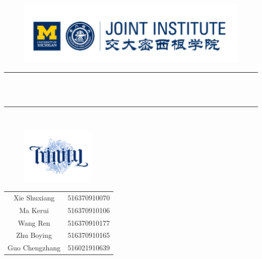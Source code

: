 \begin{titlepage}

\begin{figure}[H]
    \centering
    \includegraphics[width=5.3in]{Pics/JILOGO}
\end{figure}

\begin{center}
{\rule{11cm}{0.01cm} \\ \tiny~
\\ \large {}
\rule{11cm}{0.01cm}  
\\  \large{}}
\end{center}

\begin{figure}[H]
    \centering
    \includegraphics[width=1.4in]{Pics/Logo}
\end{figure}

\normalsize
\begin{center}
\begin{tabular}{cl}
\large
\vspace{0.3em} Xie Shuxiang&516370910070\vspace{0.3em}\\ 
\large
Ma Kerui\vspace{0.3em} &516370910106 \vspace{0.3em}\\ 
\large
Wang Ren\vspace{0.3em} &516370910177 \vspace{0.3em}\\ 
\large
Zhu Boying\vspace{0.3em} &516370910165 \vspace{0.3em}\\ 
\large
Guo Chengzhang\vspace{0.3em} &516021910639 \vspace{0.3em}\\ 
 

\end{tabular}
\end{center}
\end{titlepage}
